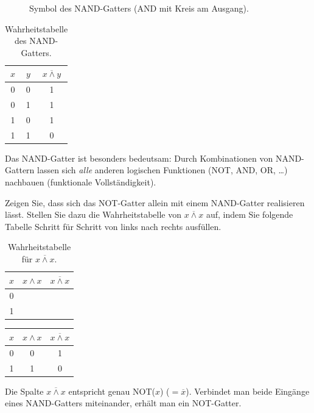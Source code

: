 \begin{figure}[H]
    \centering
    
    \caption{Symbol des NAND-Gatters (AND mit Kreis am Ausgang).}
    \label{fig:nand_gatter}
\end{figure}

\begin{table}[H]
    \centering
    \begin{tabular}{ccc}
        $x$ & $y$ & $\overline{x \wedge y}$ \\\midrule\midrule
        0 & 0 & 1 \\\midrule
        0 & 1 & 1 \\\midrule
        1 & 0 & 1 \\\midrule
        1 & 1 & 0 \\
    \end{tabular}
    \caption{Wahrheitstabelle des NAND-Gatters.}
    \label{tab:nand}
\end{table}

Das NAND-Gatter ist besonders bedeutsam: Durch Kombinationen von NAND-Gattern lassen sich \emph{alle} anderen logischen Funktionen (NOT, AND, OR, \ldots) nachbauen (funktionale Vollständigkeit).

\begin{mychallenge}\label{myexercise:nand-not}
    Zeigen Sie, dass sich das NOT-Gatter allein mit einem NAND-Gatter realisieren lässt. Stellen Sie dazu die Wahrheitstabelle von $\overline{x \wedge x}$ auf, indem Sie folgende Tabelle Schritt für Schritt von links nach rechts ausfüllen.
    \begin{table}[H]
        \centering
        \begin{tabular}{c|c|c}
            $x$ & $x \wedge x$ & $\overline{x \wedge x}$ \\\midrule\midrule
            0 & & \\\midrule
            1 & & \\
        \end{tabular}
        \caption{Wahrheitstabelle für $\overline{x \wedge x}$.}
        \label{tab:nand-not}
    \end{table}
    \begin{myanswer}
        \begin{center}
            \begin{tabular}{c|c|c}
                $x$ & $x \wedge x$ & $\overline{x \wedge x}$ \\\midrule\midrule
                0 & 0 & 1 \\\midrule
                1 & 1 & 0 \\
            \end{tabular}
        \end{center}
        Die Spalte $\overline{x \wedge x}$ entspricht genau NOT($x$) ($=\overline{x}$). Verbindet man beide Eingänge eines NAND-Gatters miteinander, erhält man ein NOT-Gatter.
    \end{myanswer}
\end{mychallenge}

